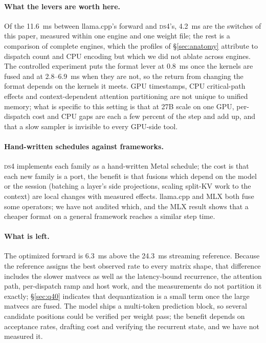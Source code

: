 \documentclass[11pt]{article}
\newcommand{\ds}{\textsc{ds4}}
\begin{document}
\paragraph{What the levers are worth here.} Of the 11.6~ms between
llama.cpp's forward and \ds{}'s, 4.2~ms are the switches of this paper,
measured within one engine and one weight file; the rest is a comparison of
complete engines, which the profiles of \S\ref{sec:anatomy} attribute to
dispatch count and CPU encoding but which we did not ablate across engines.
The controlled experiment puts the format lever at 0.8~ms once the kernels
are fused and at 2.8--6.9~ms when they are not, so the return from changing
the format depends on the kernels it meets. GPU timestamps, CPU critical-path
effects and context-dependent attention partitioning are not unique to
unified memory; what is specific to this setting is that at 27B scale on one
GPU, per-dispatch cost and CPU gaps are each a few percent of the step and
add up, and that a slow sampler is invisible to every GPU-side tool.
\paragraph{Hand-written schedules against frameworks.} \ds{} implements each
family as a hand-written Metal schedule; the cost is that each new family is a
port, the benefit is that fusions which depend on the model or the session
(batching a layer's side projections, scaling split-KV work to the context)
are local changes with measured effects. llama.cpp and MLX both fuse some
operators; we have not audited which, and the MLX result shows that a cheaper
format on a general framework reaches a similar step time.
\paragraph{What is left.} The optimized forward is 6.3~ms above the 24.3~ms
streaming reference. Because the reference assigns the best observed rate to
every matrix shape, that difference includes the slower matvecs as well as
the latency-bound recurrence, the attention path, per-dispatch ramp and host
work, and the measurements do not partition it exactly; \S\ref{sec:q40}
indicates that dequantization is a small term once the large matvecs are
fused. The model ships a multi-token prediction block, so several candidate
positions could be verified per weight pass; the benefit depends on
acceptance rates, drafting cost and verifying the recurrent state, and we
have not measured it.
\end{document}

